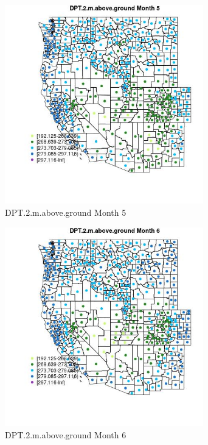 \begin{figure} 
\centering  
\includegraphics[width=0.77\textwidth]{Code_Outputs/df_report_ML_predictors_CountyCentroid_Locations_Dates_2008-01-01to2018-12-31_MapObsMo5DPT2maboveground.jpg} 
\caption{\label{fig:df_report_ML_predictors_CountyCentroid_Locations_Dates_2008-01-01to2018-12-31MapObsMo5DPT2maboveground}DPT.2.m.above.ground Month 5} 
\end{figure} 
 

\begin{figure} 
\centering  
\includegraphics[width=0.77\textwidth]{Code_Outputs/df_report_ML_predictors_CountyCentroid_Locations_Dates_2008-01-01to2018-12-31_MapObsMo6DPT2maboveground.jpg} 
\caption{\label{fig:df_report_ML_predictors_CountyCentroid_Locations_Dates_2008-01-01to2018-12-31MapObsMo6DPT2maboveground}DPT.2.m.above.ground Month 6} 
\end{figure} 
 

